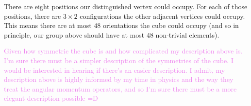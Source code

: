 \documentclass[12pt,letterpaper,boxed]{hmcpset}
\newcommand{\wg}[1]{\textcolor{violet}{#1}}
\begin{document}
\begin{solution}
There are eight positions our distinguished vertex could occupy. For
each of those positions, there are $3 \times 2$ configurations the
other adjacent vertices could occupy. This means there are at most
$48$ orientations the cube could occupy (and so in principle, our
group above should have at most $48$ non-trivial elements). 

\wg{Given how symmetric the cube is and how complicated my description
above is. I'm sure there must be a simpler description of the
symmetries of the cube. I would be interested in hearing if there's an
easier description. I admit, my description above is highly informed
by my time in physics and the way they treat the angular momentum
operators, and so I'm sure there must be a more elegant description
possible =D}

\end{solution}

\newpage

\end{document}
